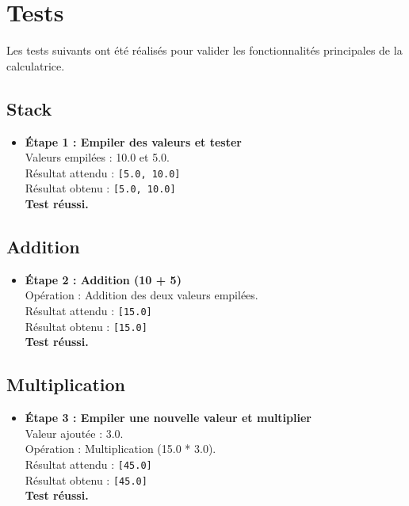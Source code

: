 \documentclass[12pt, a4paper, onecolumn]{article}
\begin{document}
\pagebreak

\section{Tests}

Les tests suivants ont été réalisés pour valider les fonctionnalités principales de la calculatrice. 

\subsection{Stack}
\begin{itemize}
	\item \textbf{Étape 1 : Empiler des valeurs et tester} \\
	Valeurs empilées : 10.0 et 5.0. \\
	Résultat attendu : \texttt{[5.0, 10.0]} \\
	Résultat obtenu : \texttt{[5.0, 10.0]} \\
	\textbf{Test réussi.}
\end{itemize}

\subsection{Addition}
\begin{itemize}
	\item \textbf{Étape 2 : Addition (10 + 5)} \\
	Opération : Addition des deux valeurs empilées. \\
	Résultat attendu : \texttt{[15.0]} \\
	Résultat obtenu : \texttt{[15.0]} \\
	\textbf{Test réussi.}
\end{itemize}

\subsection{Multiplication}
\begin{itemize}
	\item \textbf{Étape 3 : Empiler une nouvelle valeur et multiplier} \\
	Valeur ajoutée : 3.0. \\
	Opération : Multiplication (15.0 * 3.0). \\
	Résultat attendu : \texttt{[45.0]} \\
	Résultat obtenu : \texttt{[45.0]} \\
	\textbf{Test réussi.}
\end{itemize}
\end{document}
